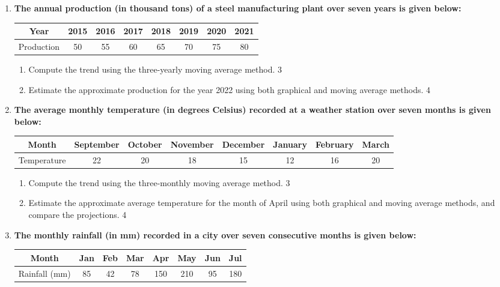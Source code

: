 \documentclass[a4paper,oneside]{book}
\begin{document}
\begin{enumerate}
  \item
\textbf{The annual production (in thousand tons) of a steel manufacturing plant over seven years is given below:}

\begin{table}[h]
\centering
\begin{tabular}{cccccccc}
Year     & 2015 & 2016 & 2017 & 2018 & 2019 & 2020 & 2021 \\ \hline
Production & 50   & 55   & 60   & 65   & 70   & 75   & 80   
\end{tabular}
\end{table}

\begin{enumerate}
    \item  
    Compute the trend using the three-yearly moving average method. \hfill 3
    \item
    Estimate the approximate production for the year 2022 using both graphical and moving average methods. \hfill 4
\end{enumerate}

\item
\textbf{The average monthly temperature (in degrees Celsius) recorded at a weather station over seven months is given below:}

\begin{table}[H]
\centering
\begin{tabular}{c|c|c|c|c|c|c|c}
Month & September & October & November & December & January & February & March \\ \hline
Temperature & 22 & 20 & 18 & 15 & 12 & 16 & 20
\end{tabular}
\end{table}

\begin{enumerate}
\item
Compute the trend using the three-monthly moving average method. \hfill 3
\item
Estimate the approximate average temperature for the month of April using both graphical and moving average methods, and compare the projections. \hfill 4
\end{enumerate}

\item  
\textbf{The monthly rainfall (in mm) recorded in a city over seven consecutive months is given below:}  

\begin{table}[h]  
\centering  
\begin{tabular}{cccccccc}  
Month     & Jan  & Feb  & Mar  & Apr  & May  & Jun  & Jul  \\ \hline  
Rainfall (mm) & 85   & 42   & 78   & 150  & 210  & 95   & 180    
\end{tabular}  
\end{table}  


\end{enumerate}
\end{document}
